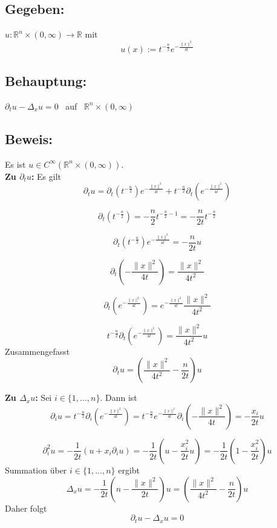 \documentclass[a4paper, 12pt]{article} %
\begin{document}
\begin{flushleft}
    \subsection*{Gegeben:}
    $u:\mathbb{R}^n \times (0,\infty)\rightarrow \mathbb{R}$ mit
    $$
        u(x) := t^{-\frac{n}{2}} e^{-\frac{\|x\|^2}{4t}}
    $$

    \subsection*{Behauptung:}
    $\partial_t u - \Delta_x u = 0$ \, auf \, $\mathbb{R}^n \times (0,\infty)$

    \subsection*{Beweis:}
    Es ist $u \in C^\infty(\mathbb{R}^n\times (0,\infty))$.\\
    \textbf{Zu $\partial_t u$:} Es gilt
    $$
        \partial_t u = \partial_t \left (t^{-\frac{n}{2}} \right ) e^{-\frac{\|x\|^2}{4t}}
        + t^{-\frac{n}{2}} \partial_t \left ( e^{-\frac{\|x\|^2}{4t}} \right )
    $$

    $$
        \partial_t \left (t^{-\frac{n}{2}} \right ) = -\frac{n}{2} t^{-\frac{n}{2}-1}
        = -\frac{n}{2t} t^{-\frac{n}{2}}
    $$

    $$
        \partial_t \left (t^{-\frac{n}{2}} \right ) e^{-\frac{\|x\|^2}{4t}}
        = -\frac{n}{2t}u
    $$

    $$
        \partial_t \left (-\frac{\|x\|^2}{4t} \right ) = \frac{\|x\|^2}{4t^2}
    $$

    $$
        \partial_t \left (e^{-\frac{\|x\|^2}{4t}} \right )
        = e^{-\frac{\|x\|^2}{4t}} \frac{\|x\|^2}{4t^2}
    $$

    $$
        t^{-\frac{n}{2}} \partial_t \left ( e^{-\frac{\|x\|^2}{4t}} \right )
        = \frac{\|x\|^2}{4t^2} u
    $$
    Zusammengefasst
    $$
        \partial_t u = \left ( \frac{\|x\|^2}{4t^2} - \frac{n}{2t} \right ) u
    $$

    \textbf{Zu $\Delta_x u$:} Sei $i \in \{1,...,n\}$. Dann ist
    $$
        \partial_i u = t^{-\frac{n}{2}} \partial_i \left (e^{-\frac{\|x\|^2}{4t}} \right )
        = t^{-\frac{n}{2}} e^{-\frac{\|x\|^2}{4t}} \partial_i \left (-\frac{\|x\|^2}{4t} \right )
        = - \frac{x_i}{2t} u
    $$

    $$
        \partial^2_i u = - \frac{1}{2t} (u + x_i \partial_i u)
        = - \frac{1}{2t} (u - \frac{x^2_i}{2t} u)
        = - \frac{1}{2t} (1 - \frac{x^2_i}{2t}) u
    $$
    Summation über $i \in \{1,...,n\}$ ergibt
    $$
        \Delta_x u = - \frac{1}{2t} \left (n - \frac{\|x\|^2}{2t} \right ) u
        = \left (\frac{\|x\|^2}{4t^2}- \frac{n}{2t} \right ) u
    $$
    Daher folgt
    $$
        \partial_t u - \Delta_x u = 0
    $$
    \QEDB



\end{flushleft}
\end{document}
